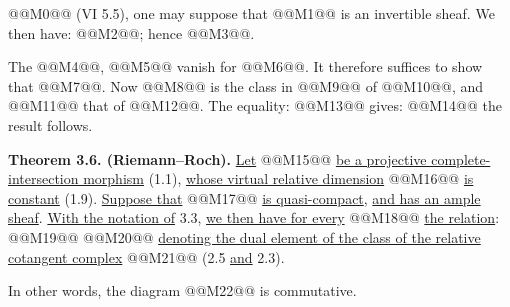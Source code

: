 @@M0@@ (VI 5.5), one
may suppose that @@M1@@ is an invertible sheaf. We then have: @@M2@@; hence @@M3@@.

The @@M4@@, @@M5@@ vanish for @@M6@@. It therefore suffices to show that @@M7@@. Now @@M8@@ is the class in @@M9@@ of @@M10@@, and @@M11@@ that of @@M12@@. The equality:
@@M13@@
gives:
@@M14@@
the result follows.

\textbf{Theorem 3.6. (Riemann--Roch).} \uline{Let} @@M15@@ \uline{be a projective complete-intersection morphism} (1.1), \uline{whose virtual relative dimension} @@M16@@ \uline{is constant} (1.9). \uline{Suppose that} @@M17@@ \uline{is quasi-compact}, \uline{and has an ample sheaf}. \uline{With the notation of} 3.3, \uline{we then have for every} @@M18@@ \uline{the relation}:
@@M19@@
@@M20@@ \uline{denoting the dual element of the class of the relative cotangent complex} @@M21@@ (2.5 \uline{and} 2.3).

In other words, the diagram
@@M22@@
is commutative.
